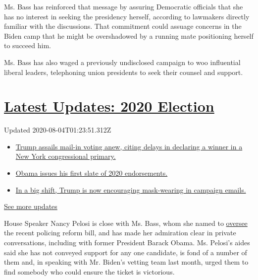 Ms. Bass has reinforced that message by assuring Democratic officials
that she has no interest in seeking the presidency herself, according to
lawmakers directly familiar with the discussions. That commitment could
assuage concerns in the Biden camp that he might be overshadowed by a
running mate positioning herself to succeed him.

Ms. Bass has also waged a previously undisclosed campaign to woo
influential liberal leaders, telephoning union presidents to seek their
counsel and support.

\hypertarget{latest-updates-2020-election}{%
\section{\texorpdfstring{\href{https://www.nytimes.com/2020/08/03/us/elections/biden-vs-trump.html?action=click\&pgtype=Article\&state=default\&region=MAIN_CONTENT_1\&context=storylines_live_updates}{Latest
Updates: 2020
Election}}{Latest Updates: 2020 Election}}\label{latest-updates-2020-election}}

Updated 2020-08-04T01:23:51.312Z

\begin{itemize}
\tightlist
\item
  \href{https://www.nytimes.com/2020/08/03/us/elections/biden-vs-trump.html?action=click\&pgtype=Article\&state=default\&region=MAIN_CONTENT_1\&context=storylines_live_updates\#link-6494b448}{Trump
  assails mail-in voting anew, citing delays in declaring a winner in a
  New York congressional primary.}
\item
  \href{https://www.nytimes.com/2020/08/03/us/elections/biden-vs-trump.html?action=click\&pgtype=Article\&state=default\&region=MAIN_CONTENT_1\&context=storylines_live_updates\#link-3de249e6}{Obama
  issues his first slate of 2020 endorsements.}
\item
  \href{https://www.nytimes.com/2020/08/03/us/elections/biden-vs-trump.html?action=click\&pgtype=Article\&state=default\&region=MAIN_CONTENT_1\&context=storylines_live_updates\#link-54e34d20}{In
  a big shift, Trump is now encouraging mask-wearing in campaign
  emails.}
\end{itemize}

\href{https://www.nytimes.com/2020/08/03/us/elections/biden-vs-trump.html?action=click\&pgtype=Article\&state=default\&region=MAIN_CONTENT_1\&context=storylines_live_updates}{See
more updates}

House Speaker Nancy Pelosi is close with Ms. Bass, whom she named to
\href{https://www.nytimes.com/2020/06/10/us/politics/karen-bass.html}{oversee}
the recent policing reform bill, and has made her admiration clear in
private conversations, including with former President Barack Obama. Ms.
Pelosi's aides said she has not conveyed support for any one candidate,
is fond of a number of them and, in speaking with Mr. Biden's vetting
team last month, urged them to find somebody who could ensure the ticket
is victorious.

